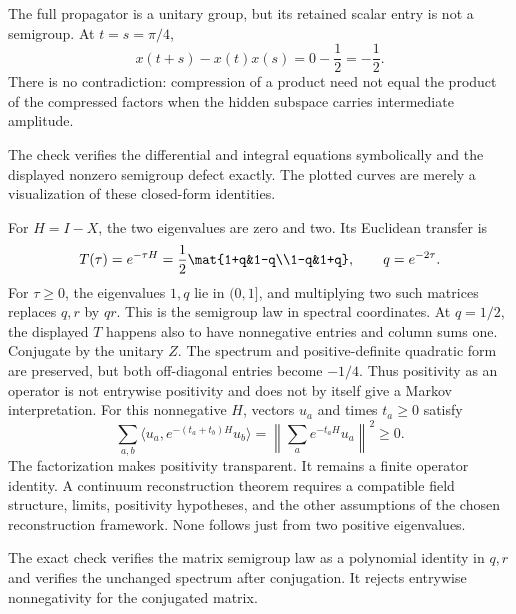 The full propagator is a unitary group, but its retained scalar entry is not a semigroup. At $t=s=\pi/4$,
\[
x(t+s)-x(t)x(s)=0-\frac12=-\frac12.
\]
There is no contradiction: compression of a product need not equal the product of the compressed factors when the hidden subspace carries intermediate amplitude.

The check verifies the differential and integral equations symbolically and the displayed nonzero semigroup defect exactly. The plotted curves are merely a visualization of these closed-form identities.

For $H=I-X$, the two eigenvalues are zero and two. Its Euclidean transfer is
\[
T(\tau)=e^{-\tau H}
=\frac12\mat{1+q&1-q\\1-q&1+q},\qquad q=e^{-2\tau}.
\]
For $\tau\ge0$, the eigenvalues $1,q$ lie in $(0,1]$, and multiplying two such matrices replaces $q,r$ by $qr$. This is the semigroup law in spectral coordinates.
At $q=1/2$, the displayed $T$ happens also to have nonnegative entries and column sums one. Conjugate by the unitary $Z$. The spectrum and positive-definite quadratic form are preserved, but both off-diagonal entries become $-1/4$. Thus positivity as an operator is not entrywise positivity and does not by itself give a Markov interpretation.
For this nonnegative $H$, vectors $u_a$ and times $t_a\ge0$ satisfy
\[
\sum_{a,b}\langle u_a,e^{-(t_a+t_b)H}u_b\rangle
=\left\|\sum_a e^{-t_aH}u_a\right\|^2\ge0.
\]
The factorization makes positivity transparent. It remains a finite operator identity. A continuum reconstruction theorem requires a compatible field structure, limits, positivity hypotheses, and the other assumptions of the chosen reconstruction framework. None follows just from two positive eigenvalues.

The exact check verifies the matrix semigroup law as a polynomial identity in $q,r$ and verifies the unchanged spectrum after conjugation. It rejects entrywise nonnegativity for the conjugated matrix.

